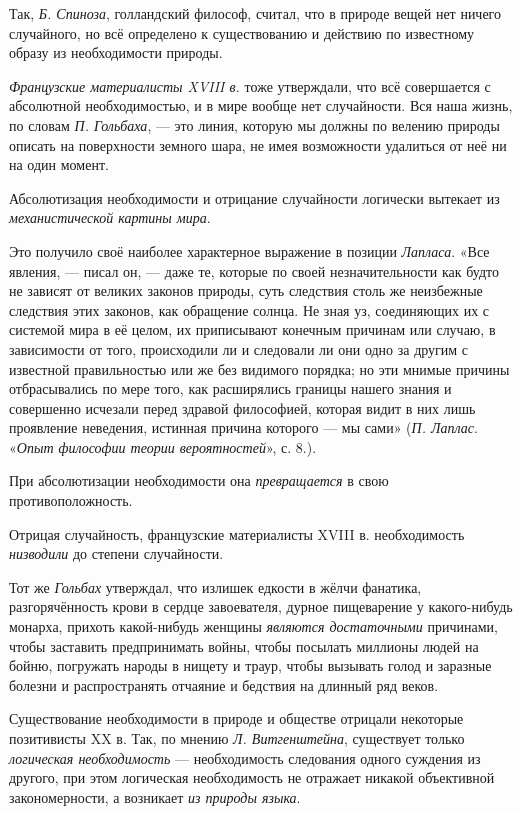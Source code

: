 \documentclass[a4paper,14pt,russian]{extreport}
\begin{document}
Так, \emph{Б. Спиноза}, голландский философ, считал, что в природе вещей нет ничего случайного, но всё определено к существованию и действию по известному образу из необходимости природы.

\emph{Французские материалисты XVIII в.} тоже утверждали, что всё совершается с абсолютной необходимостью, и в мире вообще нет случайности. Вся наша жизнь, по словам \emph{П. Гольбаха}, --- это линия, которую мы должны по велению природы описать на поверхности земного шара, не имея возможности удалиться от неё ни на один момент.

Абсолютизация необходимости и отрицание случайности логически вытекает из \emph{механистической картины мира}.

Это получило своё наиболее характерное выражение в позиции \emph{Лапласа}. «Все явления, --- писал он, --- даже те, которые по своей незначительности как будто не зависят от великих законов природы, суть следствия столь же неизбежные следствия этих законов, как обращение солнца. Не зная уз, соединяющих их с системой мира в её целом, их приписывают конечным причинам или случаю, в зависимости от того, происходили ли и следовали ли они одно за другим с известной правильностью или же без видимого порядка; но эти мнимые причины отбрасывались по мере того, как расширялись границы нашего знания и совершенно исчезали перед здравой философией, которая видит в них лишь проявление неведения, истинная причина которого --- мы сами» (\emph{П. Лаплас}. «\emph{Опыт философии теории вероятностей}», с. 8.).

При абсолютизации необходимости она \emph{превращается} в свою противоположность.

Отрицая случайность, французские материалисты XVIII в. необходимость \emph{низводили} до степени случайности.

Тот же \emph{Гольбах} утверждал, что излишек едкости в жёлчи фанатика, разгорячённость крови в сердце завоевателя, дурное пищеварение у какого-нибудь монарха, прихоть какой-нибудь женщины \emph{являются достаточными} причинами, чтобы заставить предпринимать войны, чтобы посылать миллионы людей на бойню, погружать народы в нищету и траур, чтобы вызывать голод и заразные болезни и распространять отчаяние и бедствия на длинный ряд веков.

Существование необходимости в природе и обществе отрицали некоторые позитивисты XX в. Так, по мнению \emph{Л. Витгенштейна}, существует только \emph{логическая необходимость} --- необходимость следования одного суждения из другого, при этом логическая необходимость не отражает никакой объективной закономерности, а возникает \emph{из природы языка}.
\end{document}
